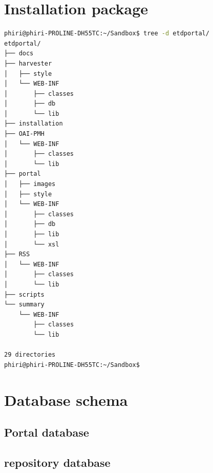 \documentclass[a4paper,11pt]{article}
\begin{document}
\section{Installation package}

\begin{lstlisting}[language=bash]
phiri@phiri-PROLINE-DH55TC:~/Sandbox$ tree -d etdportal/
etdportal/
├── docs
├── harvester
│   ├── style
│   └── WEB-INF
│       ├── classes
│       ├── db
│       └── lib
├── installation
├── OAI-PMH
│   └── WEB-INF
│       ├── classes
│       └── lib
├── portal
│   ├── images
│   ├── style
│   └── WEB-INF
│       ├── classes
│       ├── db
│       ├── lib
│       └── xsl
├── RSS
│   └── WEB-INF
│       ├── classes
│       └── lib
├── scripts
└── summary
    └── WEB-INF
        ├── classes
        └── lib

29 directories
phiri@phiri-PROLINE-DH55TC:~/Sandbox$  
\end{lstlisting}


\section{Database schema}

\subsection{Portal database}



\subsection{repository database}
\end{document}
